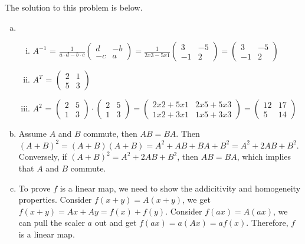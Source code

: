 \documentclass[10pt]{article}
\begin{document}
\begin{solution} 
The solution to this problem is below.
\begin{enumerate}[(a)]
    \item 
    \begin{enumerate}[(i)]
        \item $A^{-1}$ = $\frac{1}{a\cdot d-b\cdot c}\begin{pmatrix}d & -b \\ -c & a\end{pmatrix} = \frac{1}{2x3-5x1}\begin{pmatrix}3 & -5 \\ -1 & 2\end{pmatrix} = \begin{pmatrix}3 & -5 \\ -1 & 2\end{pmatrix}$
        \item $A^T$ = $\begin{pmatrix}2 & 1 \\ 5 & 3\end{pmatrix}$
        \item $A^2$ = $\begin{pmatrix}2 & 5 \\ 1 & 3\end{pmatrix} \cdot \begin{pmatrix}2 & 5 \\ 1 & 3\end{pmatrix} = \begin{pmatrix}2x2+5x1 & 2x5+5x3 \\ 1x2+3x1 & 1x5+3x3\end{pmatrix} = \begin{pmatrix}12 & 17 \\ 5 & 14\end{pmatrix}$
    \end{enumerate}
    \item Assume $A$ and $B$ commute, then $AB = BA$. Then $(A+B)^2 = (A+B)(A+B) = A^2 + AB + BA + B^2 = A^2 + 2AB + B^2$. Conversely, if $(A+B)^2 = A^2 + 2AB + B^2$, then $AB = BA$, which implies that $A$ and $B$ commute. 
    \item To prove $f$ is a linear map, we need to show the addicitivity and homogeneity properties. Consider $f(x+y) = A(x+y)$, we get $f(x+y) = Ax + Ay = f(x) + f(y)$. Consider $f(ax) = A(ax)$, we can pull the scaler $a$ out and get $f(ax) = a(Ax) = af(x)$. Therefore, $f$ is a linear map.
\end{enumerate}
\end{solution}
\end{document}

